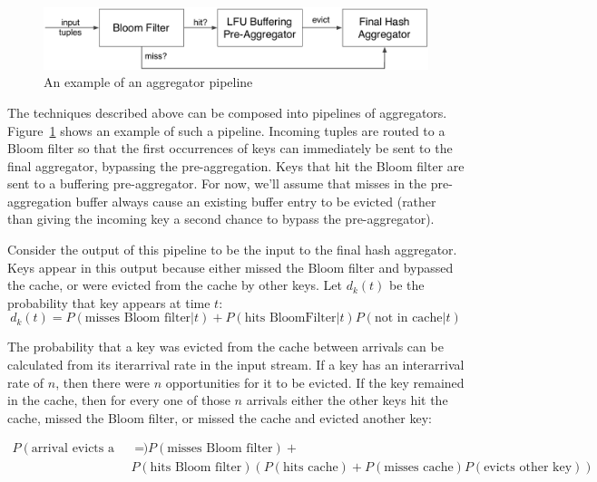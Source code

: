 \documentclass[twocolumn, 10pt]{article}
\begin{document}
\begin{figure}
\begin{center}
    \includegraphics[width=\columnwidth]{figures/aggregator_pipeline}
\end{center}
\caption{An example of an aggregator pipeline}
\label{fig:aggregator_pipeline}
\end{figure}

The techniques described above can be composed into pipelines of aggregators.
Figure~\ref{fig:aggregator_pipeline} shows an example of such a pipeline.
Incoming tuples are routed to a Bloom filter so that the first occurrences of
keys can immediately be sent to the final aggregator, bypassing the
pre-aggregation.  Keys that hit the Bloom filter are sent to a buffering
pre-aggregator.  For now, we'll assume that misses in the pre-aggregation
buffer always cause an existing buffer entry to be evicted (rather than giving
the incoming key a second chance to bypass the pre-aggregator).


Consider the output of this pipeline to be the input to the final hash
aggregator.  Keys appear in this output because either missed the Bloom filter
and bypassed the cache, or were evicted from the cache by other keys.  Let
$d_k(t)$ be the probability that key appears at time $t$:
\[
    d_k(t) = P\left(\text{misses Bloom filter}|t\right)
                +
             P\left(\text{hits BloomFilter}|t\right)
             P\left(\text{not in cache}|t\right)
\]

The probability that a key was evicted from the cache between arrivals can be
calculated from its iterarrival rate in the input stream.  If a key has an
interarrival rate of $n$, then there were $n$ opportunities for it to be
evicted.  If the key remained in the cache, then for every one of those $n$
arrivals either the other keys hit the cache, missed the Bloom filter, or
missed the cache and evicted another key:

\begin{align*}
    P\left(\text{arrival evicts a particular key}\right)
    &=  P\left(\text{misses Bloom filter}\right) + \\
    &
    P\left(\text{hits Bloom filter}\right)
    \left(
        P\left(\text{hits cache}\right)
        + P\left(\text{misses cache}\right)P\left(\text{evicts other key}\right)
    \right)
    \\
\end{align*}
\end{document}
